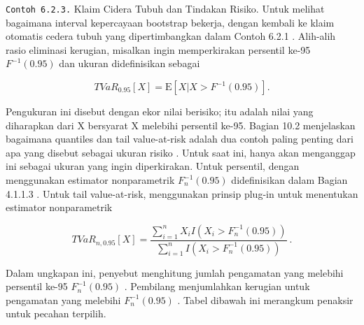 \documentclass[
]{book}
\begin{document}
\texttt{Contoh\ 6.2.3.} Klaim Cidera Tubuh dan Tindakan Risiko. Untuk melihat bagaimana interval kepercayaan bootstrap bekerja, dengan kembali ke klaim otomatis cedera tubuh yang dipertimbangkan dalam Contoh 6.2.1 . Alih-alih rasio eliminasi kerugian, misalkan ingin memperkirakan persentil ke-95 \(F^{-1}(0.95)\) dan ukuran didefinisikan sebagai

\[TVaR_{0.95}[X] = \mathrm{E}[X | X > F^{-1}(0.95)] .\]

Pengukuran ini disebut dengan ekor nilai berisiko; itu adalah nilai yang diharapkan dari X bersyarat X melebihi persentil ke-95. Bagian 10.2 menjelaskan bagaimana quantiles dan tail value-at-risk adalah dua contoh paling penting dari apa yang disebut sebagai ukuran risiko . Untuk saat ini, hanya akan menganggap ini sebagai ukuran yang ingin diperkirakan. Untuk persentil, dengan menggunakan estimator nonparametrik \(F^{-1}_n(0.95)\) didefinisikan dalam Bagian 4.1.1.3 . Untuk tail value-at-risk, menggunakan prinsip plug-in untuk menentukan estimator nonparametrik

\[TVaR_{n,0.95}[X] = \frac{\sum_{i=1}^n X_i I(X_i > F^{-1}_n(0.95))}{\sum_{i=1}^n I(X_i > F^{-1}_n(0.95))} ~.\]

Dalam ungkapan ini, penyebut menghitung jumlah pengamatan yang melebihi persentil ke-95 \(F^{-1}_n(0.95)\) . Pembilang menjumlahkan kerugian untuk pengamatan yang melebihi \(F^{-1}_n(0.95)\) . Tabel dibawah ini merangkum penaksir untuk pecahan terpilih.
\end{document}
